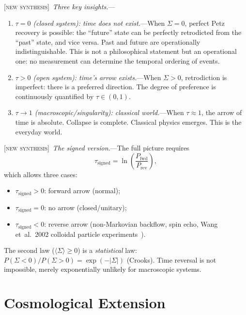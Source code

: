 \documentclass[prl,twocolumn,superscriptaddress,longbibliography,floatfix]{revtex4-2}
\newcommand{\tauasym}{\tau}
\newcommand{\newsyn}{\textsc{[new synthesis]}}
\begin{document}
\newsyn\ \emph{Three key insights.}---
\begin{enumerate}
\item \emph{$\tauasym = 0$ (closed system): time does not
  exist.}---When $\Sigma = 0$, perfect Petz recovery is
  possible: the ``future'' state can be perfectly retrodicted
  from the ``past'' state, and vice versa. Past and future are
  operationally indistinguishable. This is not a philosophical
  statement but an operational one: no measurement can
  determine the temporal ordering of events.

\item \emph{$\tauasym > 0$ (open system): time's arrow
  exists.}---When $\Sigma > 0$, retrodiction is imperfect:
  there is a preferred direction. The degree of preference is
  continuously quantified by $\tauasym \in (0, 1)$.

\item \emph{$\tauasym \to 1$ (macroscopic/singularity):
  classical world.}---When $\tauasym \approx 1$, the arrow of
  time is absolute. Collapse is complete. Classical physics
  emerges. This is the everyday world.
\end{enumerate}

\newsyn\ \emph{The signed version.}---The full picture requires
\begin{equation}
\tauasym_{\mathrm{signed}} = \ln\!\left(\frac{P_{\mathrm{fwd}}}{P_{\mathrm{rev}}}\right),
\label{eq:tau_signed}
\end{equation}
which allows three cases:
\begin{itemize}
\item $\tauasym_{\mathrm{signed}} > 0$: forward arrow (normal);
\item $\tauasym_{\mathrm{signed}} = 0$: no arrow (closed/unitary);
\item $\tauasym_{\mathrm{signed}} < 0$: reverse arrow
  (non-Markovian backflow, spin echo, Wang et~al.\ 2002
  colloidal particle experiments~\cite{Wang2002}).
\end{itemize}
The second law ($\langle \Sigma \rangle \geq 0$) is a
\emph{statistical} law: $P(\Sigma < 0)/P(\Sigma > 0) =
\exp(-|\Sigma|)$ (Crooks). Time reversal is not impossible,
merely exponentially unlikely for macroscopic systems.

\section{Cosmological Extension}
\label{sec:cosmology}
\end{document}
